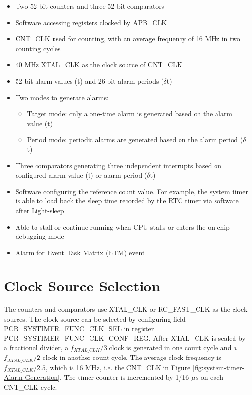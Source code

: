 \documentclass[main\_\_EN.tex]{subfiles}
\begin{document}
\begin{itemize}
    \item Two 52-bit counters and three 52-bit comparators
    \item Software accessing registers clocked by APB\_CLK
    \item CNT\_CLK used for counting, with an average frequency of 16 MHz in two counting cycles
    \item 40 MHz XTAL\_CLK as the clock source of CNT\_CLK
    \item 52-bit alarm values (t) and 26-bit alarm periods ($\delta$t)
    \item Two modes to generate alarms:
    \begin{itemize}
        \item Target mode: only a one-time alarm is generated based on the alarm value (t)
        \item Period mode: periodic alarms are generated based on the alarm period ($\delta$t)
    \end{itemize}
    \item Three comparators generating three independent interrupts based on configured alarm value (t) or alarm period ($\delta$t)
    \item Software configuring the reference count value. For example, the system timer is able to load back the sleep time recorded by the RTC timer via software after Light-sleep
    \item Able to stall or continue running when CPU stalls or enters the on-chip-debugging mode
    \item Alarm for Event Task Matrix (ETM) event
\end{itemize}


\section{Clock Source Selection}
The counters and comparators use XTAL\_CLK or RC\_FAST\_CLK as the clock sources. The clock source can be selected by configuring field \hyperref[fielddesc:PCRSYSTIMERFUNCCLKSEL]{PCR\_SYSTIMER\_FUNC\_CLK\_SEL} in register \hyperref[regdesc:PCRSYSTIMERFUNCCLKCONFREG]{PCR\_SYSTIMER\_FUNC\_CLK\_CONF\_REG}. After XTAL\_CLK is scaled by a fractional divider, a $f_{XTAL\_CLK}/3$ clock is generated in one count cycle and a $f_{XTAL\_CLK}/2$ clock in another count cycle. The average clock frequency is $f_{XTAL\_CLK}/2.5$, which is 16 MHz, i.e. the CNT\_CLK in Figure \ref{fig:system-timer-Alarm-Generation}. The timer counter is incremented by 1/16 $\mu s$ on each CNT\_CLK cycle.
\end{document}
